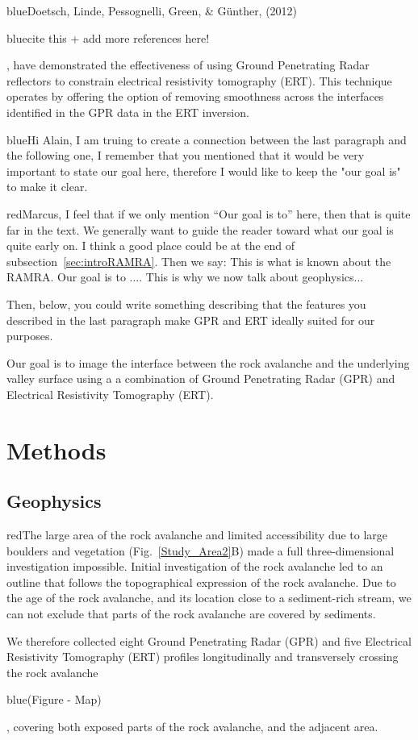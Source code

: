 \documentclass[5p]{elsarticle}
\newcommand{\COMON}{\begin{color}{blue}}
\newcommand{\COMOFF}{\end{color}}
\newcommand{\alon}{\begin{color}{red}}
\newcommand{\aloff}{\end{color}}
\begin{document}
\COMON Doetsch, Linde, Pessognelli, Green, \& Günther, (2012)\COMOFF \COMON cite this + add more references here! \COMOFF, have demonstrated the effectiveness of using Ground Penetrating Radar reflectors to constrain electrical resistivity tomography (ERT). This technique operates by offering the option of removing smoothness across the interfaces identified in the GPR data in the ERT inversion.  

\COMON Hi Alain, I am truing to create a connection between the last
paragraph and the following one, I remember that you mentioned that it
would be very important to state our goal here, therefore I would like
to keep the "our goal is" to make it clear. \COMOFF

\alon Marcus, I feel that if we only mention ``Our goal is to'' here,
then that is quite far in the text. We generally want to guide the
reader toward what our goal is quite early on. I think a good place
could be at the end of subsection~\ref{sec:introRAMRA}. Then we say:
This is what is known about the RAMRA. Our goal is to .... This is why
we now talk about geophysics...

Then, below, you could write something describing that the features
you described in the last paragraph make GPR and ERT ideally suited
for our purposes.  \aloff



Our goal is to image the interface between the rock avalanche and the underlying valley surface using a a combination of Ground Penetrating Radar (GPR) and Electrical Resistivity Tomography (ERT).


\bigskip   





\section{Methods}

\subsection{Geophysics}

\alon The large area of the rock avalanche and limited accessibility
due to large boulders and vegetation (Fig.~\ref{Study_Area2}B) made a
full three-dimensional investigation impossible. Initial investigation
of the rock avalanche led to an outline that follows the topographical
expression of the rock avalanche. Due to the age of the rock
avalanche, and its location close to a sediment-rich stream, we can
not exclude that parts of the rock avalanche are covered by
sediments. \aloff We therefore collected eight Ground Penetrating Radar
(GPR) and five Electrical Resistivity Tomography (ERT) profiles
longitudinally and transversely crossing the rock avalanche
\COMON(Figure - Map)\COMOFF, covering both exposed parts of the rock
avalanche, and the adjacent area.
\end{document}
